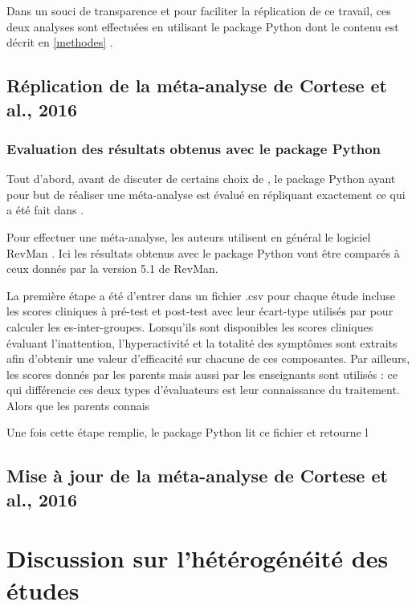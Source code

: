 Dans un souci de transparence et pour faciliter la réplication de ce travail, ces deux analyses sont effectuées en utilisant le package Python dont 
le contenu est décrit en \ref{methodes} \citep{Bussalb2019c}. 

\subsection{Réplication de la méta-analyse de Cortese et al., 2016}

\subsubsection{Evaluation des résultats obtenus avec le package Python}

Tout d'abord, avant de discuter de certains choix de \citet{Cortese2016}, le package Python ayant pour but de réaliser une méta-analyse est évalué
en répliquant exactement ce qui a été fait dans \citet{Cortese2016}. 

Pour effectuer une méta-analyse, les auteurs utilisent en général le logiciel RevMan \citep{Revman}. Ici les résultats obtenus avec le package Python vont être
comparés à ceux donnés par la version 5.1 de RevMan. 

La première étape a été d'entrer dans un fichier .csv pour chaque étude incluse les scores cliniques à pré-test et post-test avec leur écart-type utilisés 
par \citet{Cortese2016} pour calculer les \gls{es}-inter-groupes. Lorsqu'ils sont disponibles les scores cliniques évaluant l'inattention, l'hyperactivité 
et la totalité des symptômes sont extraits afin d'obtenir une valeur d'efficacité sur chacune de ces composantes. Par ailleurs, les scores donnés par les
parents mais aussi par les enseignants sont utilisés : ce qui différencie ces deux types d'évaluateurs est leur connaissance du traitement. Alors que les
parents connais

Une fois cette étape remplie, le package Python lit ce fichier et retourne l


\subsection{Mise à jour de la méta-analyse de Cortese et al., 2016}

\section{Discussion sur l'hétérogénéité des études} 